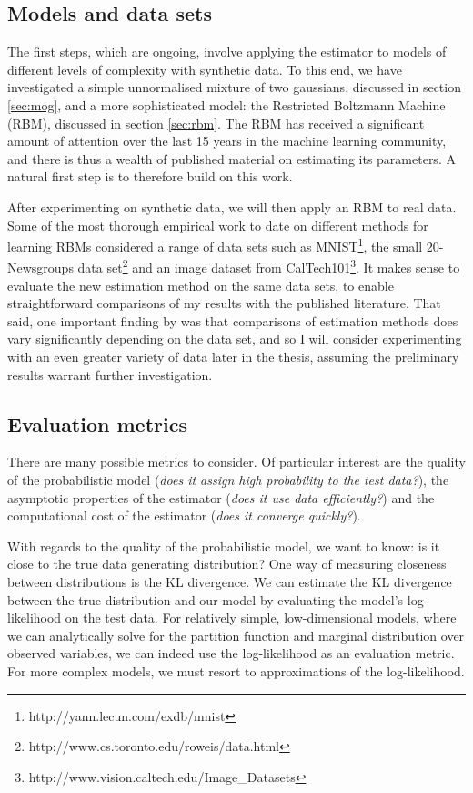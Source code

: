 \documentclass[11pt, oneside]{article}
\theoremstyle{definition}
\begin{document}
\subsection{Models and data sets}
The first steps, which are ongoing, involve applying the estimator to models of different levels of complexity with synthetic data. To this end, we have investigated a simple unnormalised mixture of two gaussians, discussed in section \ref{sec:mog}, and a more sophisticated model: the Restricted Boltzmann Machine (RBM), discussed in section \ref{sec:rbm}. The RBM has received a significant amount of attention over the last 15 years in the machine learning community, and there is thus a wealth of published material on estimating its parameters. A natural first step is to therefore build on this work.

After experimenting on synthetic data, we will then apply an RBM to real data. Some of the most thorough empirical work to date on different methods for learning RBMs \citep{marlin2010inductive} considered a range of data sets such as MNIST\footnote{http://yann.lecun.com/exdb/mnist}, the small 20-Newsgroups data set\footnote{http://www.cs.toronto.edu/roweis/data.html} and an image dataset from CalTech101\footnote{http://www.vision.caltech.edu/Image\_Datasets}. It makes sense to evaluate the new estimation method on the same data sets, to enable straightforward comparisons of my results with the published literature. That said, one important finding by \citet{marlin2010inductive} was that comparisons of estimation methods does vary significantly depending on the data set, and so I will consider experimenting with an even greater variety of data later in the thesis, assuming the preliminary results warrant further investigation.

\subsection{Evaluation metrics}
There are many possible metrics to consider. Of particular interest are the quality of the probabilistic model (\emph{does it assign high probability to the test data?}), the asymptotic properties of the estimator (\emph{does it use data efficiently?}) and the computational cost of the estimator (\emph{does it converge quickly?}).

With regards to the quality of the probabilistic model, we want to know: is it close to the true data generating distribution? One way of measuring closeness between distributions is the KL divergence. We can estimate the KL divergence between the true distribution and our model by evaluating the model's log-likelihood on the test data. For relatively simple, low-dimensional models, where we can analytically solve for the partition function and marginal distribution over observed variables, we can indeed use the log-likelihood as an evaluation metric. For more complex models, we must resort to approximations of the log-likelihood.
\end{document}

